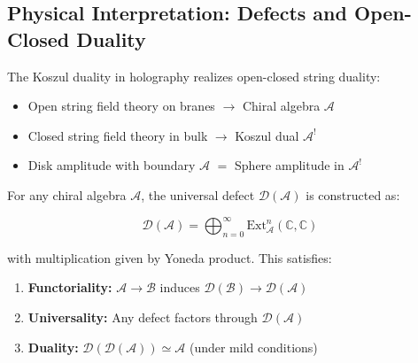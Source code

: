 \subsection{Physical Interpretation: Defects and Open-Closed Duality}

\begin{remark}
The Koszul duality in holography realizes open-closed string duality:

\begin{center}
\end{center}

\begin{itemize}
\item Open string field theory on branes $\to$ Chiral algebra $\mathcal{A}$
\item Closed string field theory in bulk $\to$ Koszul dual $\mathcal{A}^!$
\item Disk amplitude with boundary $\mathcal{A}$ $=$ Sphere amplitude in $\mathcal{A}^!$
\end{itemize}
\end{remark}

\begin{theorem}\label{thm:universal-defect-construction}
For any chiral algebra $\mathcal{A}$, the universal defect $\mathcal{D}(\mathcal{A})$ is constructed as:

$$\mathcal{D}(\mathcal{A}) = \bigoplus_{n=0}^\infty \text{Ext}^n_{\mathcal{A}}(\mathbb{C}, \mathbb{C})$$

with multiplication given by Yoneda product. This satisfies:
\begin{enumerate}
\item \textbf{Functoriality:} $\mathcal{A} \to \mathcal{B}$ induces $\mathcal{D}(\mathcal{B}) \to \mathcal{D}(\mathcal{A})$
\item \textbf{Universality:} Any defect factors through $\mathcal{D}(\mathcal{A})$
\item \textbf{Duality:} $\mathcal{D}(\mathcal{D}(\mathcal{A})) \simeq \mathcal{A}$ (under mild conditions)
\end{enumerate}
\end{theorem}

